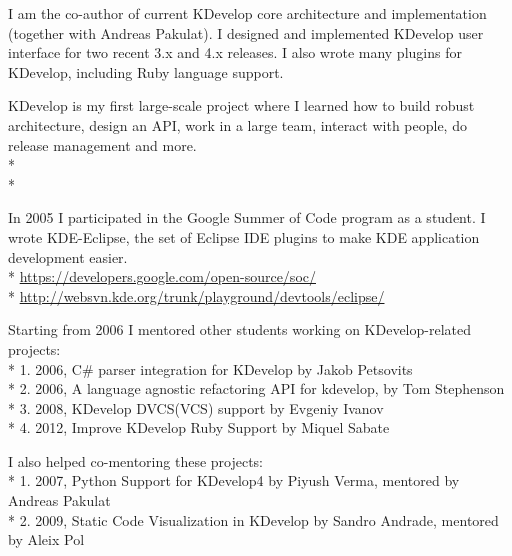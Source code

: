 \documentclass[12pt]{letter}
\begin{document}
\begin{llist}
            \item I am the co-author of current KDevelop core architecture and implementation (together with Andreas Pakulat). I designed and implemented KDevelop user interface for two recent 3.x and 4.x releases. I also wrote many plugins for KDevelop, including Ruby language support.

            \item KDevelop is my first large-scale project where I learned how to build robust architecture, design an API, work in a large team, interact with people, do release management and more.\\*
            \\*

  \endexperience

  \location{}

  \startexperience

           \item In 2005 I participated in the Google Summer of Code program as a student. I wrote KDE-Eclipse, the set of Eclipse IDE plugins to make KDE application development easier.\\*
                \url{https://developers.google.com/open-source/soc/}\\*
                \url{http://websvn.kde.org/trunk/playground/devtools/eclipse/}

           \item Starting from 2006 I mentored other students working on KDevelop-related projects:\\*
                  1. 2006, C\# parser \/ integration for KDevelop by Jakob Petsovits\\*
                  2. 2006, A language agnostic refactoring API for kdevelop, by Tom Stephenson\\*
                  3. 2008, KDevelop DVCS(VCS) support by Evgeniy Ivanov\\*
                  4. 2012, Improve KDevelop Ruby Support by Miquel Sabate

            \item I also helped co-mentoring these projects:\\*
                  1. 2007, Python Support for KDevelop4 by Piyush Verma, mentored by Andreas Pakulat\\*
                  2. 2009, Static Code Visualization in KDevelop by Sandro Andrade, mentored by Aleix Pol


\end{llist}
\end{document}
